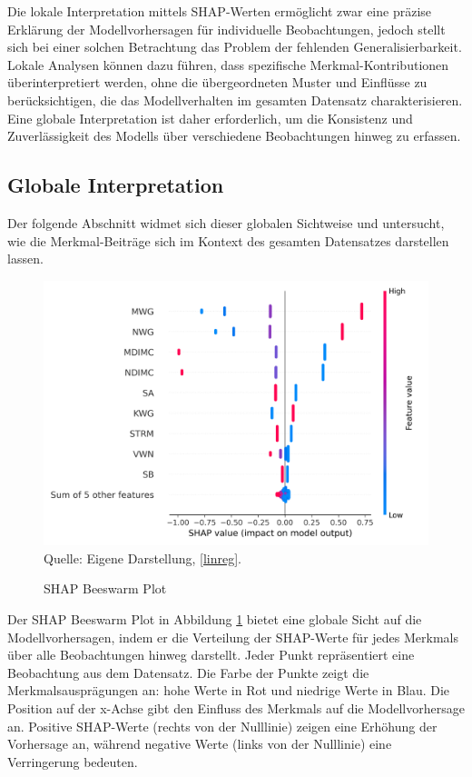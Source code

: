 Die lokale Interpretation mittels SHAP-Werten ermöglicht zwar eine präzise Erklärung 
der Modellvorhersagen für individuelle Beobachtungen, jedoch stellt sich bei einer 
solchen Betrachtung das Problem der fehlenden Generalisierbarkeit. 
Lokale Analysen können dazu führen, dass spezifische Merkmal-Kontributionen überinterpretiert werden, 
ohne die übergeordneten Muster und Einflüsse zu berücksichtigen, 
die das Modellverhalten im gesamten Datensatz charakterisieren. 
Eine globale Interpretation ist daher erforderlich, um die Konsistenz und Zuverlässigkeit 
des Modells über verschiedene Beobachtungen hinweg zu erfassen. 

\subsection{Globale Interpretation}

Der folgende Abschnitt widmet sich dieser globalen Sichtweise und untersucht, 
wie die Merkmal-Beiträge sich im Kontext des gesamten Datensatzes darstellen lassen.

\begin{figure}[!h]
    \caption{SHAP Beeswarm Plot}
    \includegraphics[width=1\textwidth]{../scripts/images/shap_beeswarm_plot_gpu.png}
    Quelle: Eigene Darstellung, \ref{linreg}.
    \label{pic:shap_beeswarm}
\end{figure}

Der SHAP Beeswarm Plot in Abbildung \ref{pic:shap_beeswarm} bietet eine globale 
Sicht auf die Modellvorhersagen, indem er die Verteilung der SHAP-Werte für jedes Merkmals 
über alle Beobachtungen hinweg darstellt. Jeder Punkt repräsentiert eine Beobachtung aus dem Datensatz.
Die Farbe der Punkte zeigt die Merkmalsausprägungen an: hohe Werte in Rot und niedrige Werte in Blau. 
Die Position auf der x-Achse gibt den Einfluss des Merkmals auf die Modellvorhersage an. 
Positive SHAP-Werte (rechts von der Nulllinie) zeigen eine Erhöhung der Vorhersage an, 
während negative Werte (links von der Nulllinie) eine Verringerung bedeuten. 

